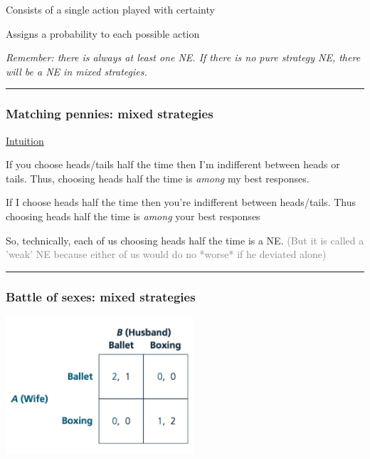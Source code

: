 \documentclass[]{article}
\providecommand{\tightlist}{%
  \setlength{\itemsep}{0pt}\setlength{\parskip}{0pt}}
\begin{document}
\begin{description}
\tightlist
\item[Pure strategy]
Consists of a single action played with certainty
\end{description}

\bigskip

\begin{description}
\tightlist
\item[Mixed strategy]
Assigns a probability to each possible action
\end{description}

\bigskip

\emph{Remember: there is always at least one NE. If there is no pure strategy NE, there will be a NE in mixed strategies.}

\begin{center}\rule{0.5\linewidth}{\linethickness}\end{center}

\hypertarget{matching-pennies-mixed-strategies}{%
\subsubsection{Matching pennies: mixed strategies}\label{matching-pennies-mixed-strategies}}

\underline{Intuition}

If you choose heads/tails half the time then I'm indifferent between heads or tails. Thus, choosing heads half the time is \emph{among} my best responses.

If I choose heads half the time then you're indifferent between heads/tails. Thus choosing heads half the time is \emph{among} your best responses

So, technically, each of us choosing heads half the time is a NE. \textcolor{gray}{(But it is called a 'weak' NE because either of us would do no *worse* if he deviated alone)}

\begin{center}\rule{0.5\linewidth}{\linethickness}\end{center}

\hypertarget{battle-of-sexes-mixed-strategies}{%
\subsubsection{Battle of sexes: mixed strategies}\label{battle-of-sexes-mixed-strategies}}

\includegraphics[height=2in]{picsfigs/bosmatrix.png}
\end{document}

